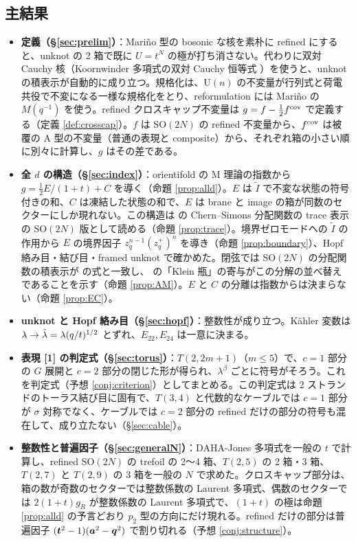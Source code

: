 \subsection{主結果}
\begin{itemize}
\item \textbf{定義（§\ref{sec:prelim}）}：Mariño 型の bosonic な核を素朴に refined にすると、unknot の 2 箱で既に $U = t^N$ の極が打ち消さない。代わりに双対 Cauchy 核（Koornwinder 多項式の双対 Cauchy 恒等式 \cite{Mimachi01}）を使うと、unknot の積表示が自動的に成り立つ。規格化は、U$(n)$ の不変量が行列式と荷電共役で不変になる一様な規格化をとり、reformulation には Mariño の $M(q^{-1})$ を使う。refined クロスキャップ不変量は $g = f - \tfrac12 f^{\mathrm{cov}}$ で定義する（定義 \ref{def:crosscap}）。$f$ は SO$(2N)$ の refined 不変量から、$f^{\mathrm{cov}}$ は被覆の A 型の不変量（普通の表現と composite）から、それぞれ箱の小さい順に別々に計算し、$g$ はその差である。
\item \textbf{全 $d$ の構造（§\ref{sec:index}）}：orientifold の M 理論の指数から $g = \tfrac12 E/(1+t) + C$ を導く（命題 \ref{prop:alld}）。$E$ は $\tilde I$ で不変な状態の符号付きの和、$C$ は凍結した状態の和で、$E$ は brane と image の箱が同数のセクターにしか現れない。この構造は \cite{Witten11} の Chern--Simons 分配関数の trace 表示の SO$(2N)$ 版として読める（命題 \ref{prop:trace}）。境界ゼロモードへの $\tilde I$ の作用から $E$ の境界因子 $z_q^{n-1}(z_q^+)^n$ を導き（命題 \ref{prop:boundary}）、Hopf 絡み目・結び目・framed unknot で確かめた。閉弦では SO$(2N)$ の分配関数の積表示が \cite{AgSc12} の式と一致し、\cite{AM22} の「Klein 瓶」の寄与がこの分解の並べ替えであることを示す（命題 \ref{prop:AM}）。$E$ と $C$ の分離は指数からは決まらない（命題 \ref{prop:EC}）。
\item \textbf{unknot と Hopf 絡み目（§\ref{sec:hopf}）}：整数性が成り立つ。Kähler 変数は $\lambda \to \tilde\lambda = \lambda(q/t)^{1/2}$ とずれ、$E_{22}, E_{24}$ は一意に決まる。
\item \textbf{表現 [1] の判定式（§\ref{sec:torus}）}：$T(2,2m+1)$（$m \le 5$）で、$c = 1$ 部分の $G$ 展開と $c = 2$ 部分の閉じた形が得られ、$\lambda^\beta$ ごとに符号がそろう。これを判定式（予想 \ref{conj:criterion}）としてまとめる。この判定式は 2 ストランドのトーラス結び目に固有で、$T(3,4)$ と代数的なケーブルでは $c = 1$ 部分が $\sigma$ 対称でなく、ケーブルでは $c = 2$ 部分の refined だけの部分の符号も混在して、成り立たない（§\ref{sec:cable}）。
\item \textbf{整数性と普遍因子（§\ref{sec:generalN}）}：DAHA-Jones 多項式を一般の $t$ で計算し、refined SO$(2N)$ の trefoil の 2〜4 箱、$T(2,5)$ の 2 箱・3 箱、$T(2,7)$ と $T(2,9)$ の 3 箱を一般の $N$ で求めた。クロスキャップ部分は、箱の数が奇数のセクターでは整数係数の Laurent 多項式、偶数のセクターでは $2(1+t)g_R$ が整数係数の Laurent 多項式で、$(1+t)$ の極は命題 \ref{prop:alld} の予言どおり $p_2$ 型の方向にだけ現れる。refined だけの部分は普遍因子 $(\bm{t}^2 - 1)(\bm{a}^2 - \bm{q}^2)$ で割り切れる（予想 \ref{conj:structure}）。

\end{itemize}
